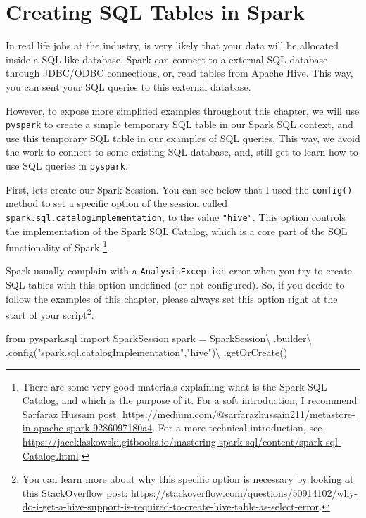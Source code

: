 \documentclass[
  11pt,
  letterpaper,
  DIV=11,
  numbers=noendperiod]{scrreprt}
\newenvironment{Shaded}{\begin{snugshade}}{\end{snugshade}}
\newcommand{\ImportTok}[1]{\textcolor[rgb]{0.00,0.46,0.62}{#1}}
\newcommand{\NormalTok}[1]{\textcolor[rgb]{0.00,0.23,0.31}{#1}}
\newcommand{\OperatorTok}[1]{\textcolor[rgb]{0.37,0.37,0.37}{#1}}
\newcommand{\StringTok}[1]{\textcolor[rgb]{0.13,0.47,0.30}{#1}}
\begin{document}
\hypertarget{creating-sql-tables-in-spark}{%
\section{Creating SQL Tables in
Spark}\label{creating-sql-tables-in-spark}}

In real life jobs at the industry, is very likely that your data will be
allocated inside a SQL-like database. Spark can connect to a external
SQL database through JDBC/ODBC connections, or, read tables from Apache
Hive. This way, you can sent your SQL queries to this external database.

However, to expose more simplified examples throughout this chapter, we
will use \texttt{pyspark} to create a simple temporary SQL table in our
Spark SQL context, and use this temporary SQL table in our examples of
SQL queries. This way, we avoid the work to connect to some existing SQL
database, and, still get to learn how to use SQL queries in
\texttt{pyspark}.

First, lets create our Spark Session. You can see below that I used the
\texttt{config()} method to set a specific option of the session called
\texttt{spark.sql.catalogImplementation}, to the value \texttt{"hive"}.
This option controls the implementation of the Spark SQL Catalog, which
is a core part of the SQL functionality of Spark \footnote{There are
  some very good materials explaining what is the Spark SQL Catalog, and
  which is the purpose of it. For a soft introduction, I recommend
  Sarfaraz Hussain post:
  \url{https://medium.com/@sarfarazhussain211/metastore-in-apache-spark-9286097180a4}.
  For a more technical introduction, see
  \url{https://jaceklaskowski.gitbooks.io/mastering-spark-sql/content/spark-sql-Catalog.html}.}.

Spark usually complain with a \texttt{AnalysisException} error when you
try to create SQL tables with this option undefined (or not configured).
So, if you decide to follow the examples of this chapter, please always
set this option right at the start of your script\footnote{You can learn
  more about why this specific option is necessary by looking at this
  StackOverflow post:
  \url{https://stackoverflow.com/questions/50914102/why-do-i-get-a-hive-support-is-required-to-create-hive-table-as-select-error}.}.

\begin{Shaded}
\begin{Highlighting}[]
\ImportTok{from}\NormalTok{ pyspark.sql }\ImportTok{import}\NormalTok{ SparkSession}
\NormalTok{spark }\OperatorTok{=}\NormalTok{ SparkSession}\OperatorTok{\textbackslash{}}
\NormalTok{  .builder}\OperatorTok{\textbackslash{}}
\NormalTok{  .config(}\StringTok{"spark.sql.catalogImplementation"}\NormalTok{,}\StringTok{"hive"}\NormalTok{)}\OperatorTok{\textbackslash{}}
\NormalTok{  .getOrCreate()}
\end{Highlighting}
\end{Shaded}
\end{document}
